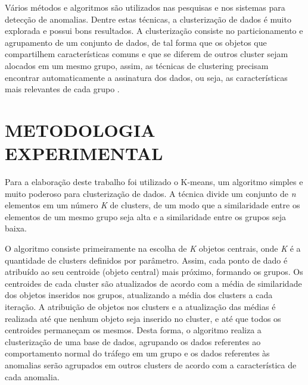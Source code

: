 \documentclass[article,12pt,oneside,a4paper,english,brazil]{unifil}
\begin{document}
\begin{Spacing}{1.5}
Vários métodos e algoritmos são utilizados nas pesquisas e nos sistemas para detecção de anomalias. Dentre estas técnicas, a clusterização de dados é muito explorada e possui bons resultados. A clusterização consiste no particionamento e agrupamento de um conjunto de dados, de tal forma que os objetos que compartilhem características comuns e que se diferem de outros cluster sejam alocados em um mesmo grupo, assim, as técnicas de clustering precisam encontrar automaticamente a assinatura dos dados, ou seja, as características mais relevantes de cada grupo \cite{rehman2009}.

\section*{METODOLOGIA EXPERIMENTAL}

Para a elaboração deste trabalho foi utilizado o  K-means, um algoritmo simples e muito poderoso para clusterização de dados. A técnica divide um conjunto de \textit{n} elementos em um número \textit{K} de clusters, de um modo que a similaridade entre os elementos de um mesmo grupo seja alta e a similaridade entre os grupos seja baixa. 

O algoritmo consiste primeiramente na escolha de \textit{K} objetos centrais, onde \textit{K}\textit{} é a quantidade de clusters definidos por parâmetro. Assim, cada ponto de dado é atribuído ao seu centroide (objeto central) mais próximo, formando os grupos. Os centroides de cada cluster são atualizados de acordo com a média de similaridade dos objetos inseridos nos grupos, atualizando a média dos clusters a cada iteração. A atribuição de objetos nos clusters e a atualização das médias é realizada até que nenhum objeto seja inserido no cluster, e até que todos os centroides permaneçam os mesmos. Desta forma, o algoritmo realiza a clusterização de uma base de dados, agrupando os dados referentes ao comportamento normal do tráfego em um grupo e os dados referentes às anomalias serão agrupados em outros clusters de acordo com a característica de cada anomalia.


\end{Spacing}
\postextual

{}
\end{document}
